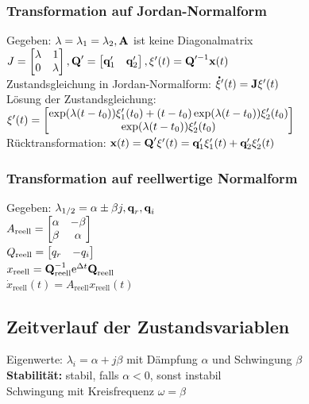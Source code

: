 \documentclass[fs, footer]{latex4ei}
\begin{document}
\begin{multicols*}{4}
    \subsubsection{Transformation auf Jordan-Normalform}
    Gegeben: $\lambda = \lambda_1 = \lambda_2, \textbf{A}$ ist keine Diagonalmatrix\\
    $J = \begin{bmatrix} \lambda & 1 \\ 0 & \lambda \end{bmatrix}, \textbf{Q}' = \begin{bmatrix} \textbf{q}_1' & \textbf{q}_2' \end{bmatrix}, \xi'(t) = \textbf{Q}'^{-1}\textbf{x}(t)$\\
    Zustandsgleichung in Jordan-Normalform: $\accentset{\mbox{\textrm{\large\bfseries .}} }{\xi} '(t) = \textbf{J} \xi '(t)$\\
    Lösung der Zustandsgleichung:\\ $\xi '(t) = \begin{bmatrix} \exp(\lambda(t-t_0))\xi_1'(t_0)+(t-t_0)\exp(\lambda(t-t_0))\xi_2'(t_0) \\ \exp(\lambda(t-t_0))\xi_2'(t_0)  \end{bmatrix}$\\
    Rücktransformation: $\textbf{x}(t) = \textbf{Q}'\xi '(t) = \textbf{q}_1'\xi_1'(t) + \textbf{q}_2'\xi_2'(t)$\\
    \subsubsection{Transformation auf reellwertige Normalform}
    Gegeben: $\lambda_{1/2} = \alpha \pm \beta j, \textbf{q}_r, \textbf{q}_i$\\
    $A_\text{reell} =  \begin{bmatrix} \alpha & - \beta \\ \beta & \alpha \end{bmatrix}$\\
    $Q_\text{reell} = \begin{bmatrix}  q_r & - q_i \end{bmatrix}$\\
    $x_\text{reell} = \textbf{Q}_\text{reell}^{-1} \mathrm{e}^{\Delta t}\textbf{Q}_\text{reell}$\\
    $\dot{x}_\text{reell} (t) = A_\text{reell}x_\text{reell}(t)$\\
    \subsection{Zeitverlauf der Zustandsvariablen}
    Eigenwerte: $\lambda_i = \alpha + j\beta$ mit Dämpfung $\alpha$ und Schwingung $\beta$\\
    \textbf{Stabilität:} stabil, falls $\alpha < 0$, sonst instabil\\
    Schwingung mit Kreisfrequenz $\omega = \beta$\\

\end{multicols*}
\end{document}
